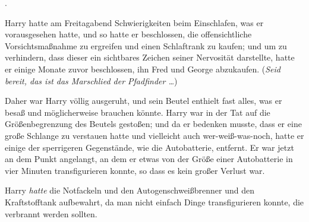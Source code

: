 
.

\hplettrineextrapara
Harry hatte am Freitagabend Schwierigkeiten beim Einschlafen, was er vorausgesehen hatte, und so hatte er beschlossen, die offensichtliche Vorsichtsmaßnahme zu ergreifen und einen Schlaftrank zu kaufen; und um zu verhindern, dass dieser ein sichtbares Zeichen seiner Nervosität darstellte, hatte er einige Monate zuvor beschlossen, ihn Fred und George abzukaufen. (\emph{Seid bereit, das ist das Marschlied der Pfadfinder …})

Daher war Harry völlig ausgeruht, und sein Beutel enthielt fast alles, was er besaß und möglicherweise brauchen könnte. Harry war in der Tat auf die Größenbegrenzung des Beutels gestoßen; und da er bedenken musste, dass er eine große Schlange zu verstauen hatte und vielleicht auch wer-weiß-was-noch, hatte er einige der sperrigeren Gegenstände, wie die Autobatterie, entfernt. Er war jetzt an dem Punkt angelangt, an dem er etwas von der Größe einer Autobatterie in vier Minuten transfigurieren konnte, so dass es kein großer Verlust war.

Harry \emph{hatte} die Notfackeln und den Autogenschweißbrenner und den Kraftstofftank aufbewahrt, da man nicht einfach Dinge transfigurieren konnte, die verbrannt werden sollten.

